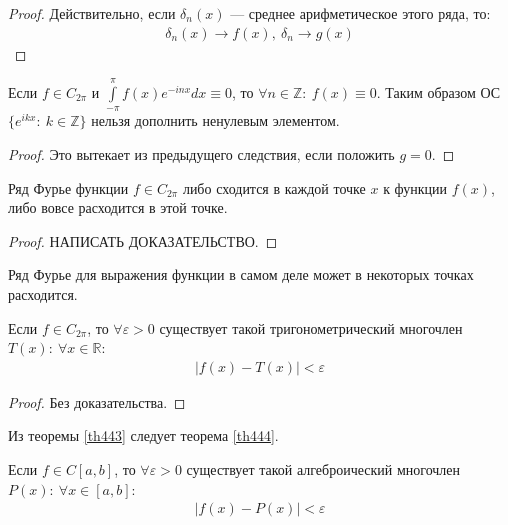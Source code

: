 \begin{proof}
  Действительно, если $\delta_n(x)$ --- среднее арифметическое этого ряда, то:
  \begin{gather*}
    \delta_n(x) \to f(x), \ \delta_n \to g(x)
  \end{gather*}
\end{proof}

\begin{consequence}
  Если $f \in C_{2\pi}$ и $\int\limits_{-\pi}^\pi f(x) e^{-inx} dx \equiv 0$,
  то $\forall n \in \mathbb{Z}: \ f(x) \equiv 0$. Таким образом ОС $\{e^{ikx}:
  \ k \in \mathbb{Z}\}$ нельзя дополнить ненулевым элементом.
\end{consequence}

\begin{proof}
  Это вытекает из предыдущего следствия, если положить $g = 0$.
\end{proof}

\begin{consequence}
  Ряд Фурье функции $f \in C_{2\pi}$ либо сходится в каждой точке $x$ к функции
  $f(x)$, либо вовсе расходится в этой точке.
\end{consequence}

\begin{proof}
  НАПИСАТЬ ДОКАЗАТЕЛЬСТВО.
\end{proof}

\begin{remark}
  Ряд Фурье для выражения функции в самом деле может в некоторых точках
  расходится.
\end{remark}

\begin{theorem}
  \label{th443}
  Если $f \in C_{2\pi}$, то $\forall \varepsilon > 0$ существует такой
  тригонометрический многочлен $T(x): \ \forall x \in \mathbb{R}$:
  \begin{gather*}
    |f(x) - T(x)| < \varepsilon
  \end{gather*}
\end{theorem}

\begin{proof}
  Без доказательства.
\end{proof}

Из теоремы \eqref{th443} следует теорема \eqref{th444}.
\begin{theorem}
  \label{th444}
  Если $f \in C[a, b]$, то $\forall \varepsilon > 0$ существует такой
  алгеброический многочлен $P(x): \ \forall x \in [a, b]$:
  \begin{gather*}
    |f(x) - P(x)| < \varepsilon
  \end{gather*}
\end{theorem}

